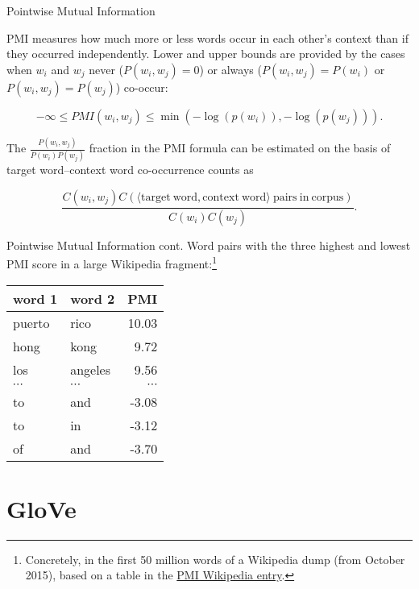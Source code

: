 \documentclass[style=upen, size=14pt]{powerdot}
\theoremstyle{definition}
\begin{document}
\begin{slide}[toc=PMI]{Pointwise Mutual Information}

  PMI measures how much more or less words occur in each other's context than
  if they occurred independently. Lower and upper bounds are provided by the
  cases when $w_i$ and $w_j$ never ($P(w_i, w_j) = 0$) or always
  ($P(w_i, w_j) = P(w_i)$ or $P(w_i, w_j) = P(w_j)$) co-occur:
\begin{small}
  $$-\infty \leq PMI(w_i, w_j) \leq \min(-\log(p(w_i)), -\log(p(w_j))).$$
\end{small}
The $\frac{P(w_i, w_j)}{P(w_i)P(w_j)}$ fraction in the PMI formula can be
estimated on the basis of target word--context word co-occurrence counts as
\begin{small}
  $$\frac{C(w_i, w_j)C(\mathrm{\langle target~word, context~word\rangle~pairs~in~corpus})}{C(w_i)C(w_j)}.$$
\end{small}

\end{slide}

\begin{slide}[toc=]{Pointwise Mutual Information cont.}
  Word pairs with the three highest and lowest PMI score in a large Wikipedia
  fragment:\footnote{Concretely, in the first 50 million words of a Wikipedia
    dump (from October 2015), based on a table in the
    \href{https://en.wikipedia.org/wiki/Pointwise_mutual_information}{PMI
      Wikipedia entry}.}
  \begin{center}
  \begin{small}
      \begin{tabular}{llr}
      \hline
      word 1 & word 2 & PMI \\
      \hline
      puerto & rico & 10.03\\
      hong & kong & 9.72\\
      los & angeles & 9.56\\
      $\cdots$ & $\cdots$ & $\cdots$\\
        to & and & -3.08 \\
      to & in & -3.12\\
      of & and & -3.70\\
    \end{tabular}
  \end{small}
    \end{center}
\end{slide}

\section{GloVe}
\end{document}

